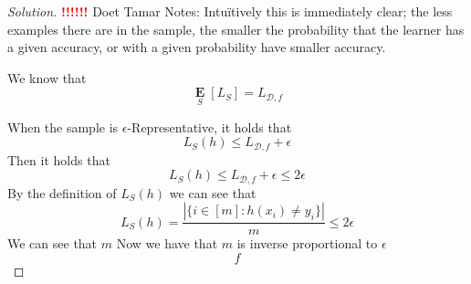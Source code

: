 \documentclass[10pt, a4paper, twoside]{amsart}
\newcommand{\R}{\ensuremath{\mathbb{R}}}
\DeclarePairedDelimiter\cbrac\{\}
\DeclarePairedDelimiter\paren()
\newcommand{\Ev}{\operatorname*{\ensuremath{\mathbf{E}}}}
\newenvironment{solution}
               {\let\oldqedsymbol=\qedsymbol
                \renewcommand{\qedsymbol}{$\blacktriangleleft$}
                \begin{proof}[Solution]}
               {\end{proof}
                \renewcommand{\qedsymbol}{\oldqedsymbol}}
\newcommand{\TODO}{\textcolor{red}{\textbf{!!!!!! }}}
\begin{document}
\begin{solution}
\TODO Doet Tamar
  Notes:
Intu\"itively this is immediately clear; the less examples there are in the sample, the smaller the probability that the learner has a given accuracy, or with a given probability have smaller accuracy.
  
  We know that 
  \begin{equation*}
    \Ev_{S}[L_S] = L_{\mathcal{D},f}
  \end{equation*}
  
  When the sample is $\epsilon$-Representative, it holds that
  \begin{equation*}
    L_S(h) \leq L_{\mathcal{D},f} +\epsilon
  \end{equation*}
  Then it holds that
  \begin{equation*}
    L_S(h) \leq L_{\mathcal{D},f} +\epsilon \leq 2\epsilon
  \end{equation*}
  By the definition of $L_S(h)$ we can see that
  \begin{equation*}
    L_S(h) = \frac{|\{i \in[m]:h(x_i)\neq y_i \}|}{m} \leq 2\epsilon
  \end{equation*}
  We can see that $m$ 
  Now we have that $m$ is inverse proportional to $\epsilon$
  \begin{equation*}
f    
  \end{equation*}
  
  



\end{solution}
\end{document}
